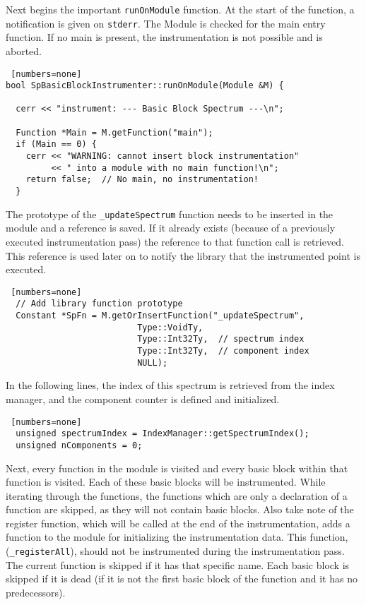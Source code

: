 Next begins the important \texttt{runOnModule} function.
At the start of the function, a notification is given on \texttt{stderr}.
The Module is checked for the main entry function.
If no main is present, the instrumentation is not possible and 
is aborted.

\begin{lstlisting} [numbers=none]
bool SpBasicBlockInstrumenter::runOnModule(Module &M) {

  cerr << "instrument: --- Basic Block Spectrum ---\n";

  Function *Main = M.getFunction("main");
  if (Main == 0) {
    cerr << "WARNING: cannot insert block instrumentation"
         << " into a module with no main function!\n";
    return false;  // No main, no instrumentation!
  }
\end{lstlisting}

The prototype of the \texttt{\_updateSpectrum} function needs to be 
inserted in the module and a reference is saved.
If it already exists (because of a previously executed instrumentation pass)
the reference to that function call is retrieved.
This reference is used later on to notify the library that the instrumented
point is executed.

\begin{lstlisting} [numbers=none]
  // Add library function prototype
  Constant *SpFn = M.getOrInsertFunction("_updateSpectrum", 
                          Type::VoidTy, 
                          Type::Int32Ty,  // spectrum index
                          Type::Int32Ty,  // component index
                          NULL);
\end{lstlisting}

In the following lines, the index of this spectrum is retrieved from 
the index manager, 
and the component counter is defined and initialized.

\begin{lstlisting} [numbers=none]
  unsigned spectrumIndex = IndexManager::getSpectrumIndex();
  unsigned nComponents = 0;
\end{lstlisting}

Next, every function in the module is visited and every basic block within
that function is visited.
Each of these basic blocks will be instrumented. 
While iterating through the functions, 
the functions which are only a declaration of a function are skipped, 
as they will not contain basic blocks.
Also take note of the register function, which will be called at the end of the instrumentation,
adds a function to the module for initializing the instrumentation data.
This function, (\texttt{\_registerAll}), should not be instrumented during the
instrumentation pass.
The current function is skipped if it has that specific name.
Each basic block is skipped if it is dead (if it is not the first basic block
of the function and it has no predecessors).

